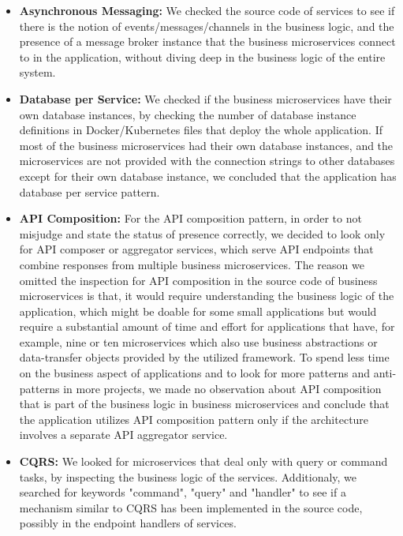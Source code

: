 \documentclass{Configuration_Files/PoliMi3i_thesis}
\begin{document}
\begin{itemize}
    \item \textbf{Asynchronous Messaging:} We checked the source code of services to see if there is the notion of events/messages/channels in the business logic, and the presence of a message broker instance that the business microservices connect to in the application, without diving deep in the business logic of the entire system.
    
    \item \textbf{Database per Service:} We checked if the business microservices have their own database instances, by checking the number of database instance definitions in Docker/Kubernetes files that deploy the whole application.
    If most of the business microservices had their own database instances, and the microservices are not provided with the connection strings to other databases except for their own database instance, we concluded that the application has database per service pattern.
    
    \item \textbf{API Composition:} For the API composition pattern, in order to not misjudge and state the status of presence correctly, we decided to look only for API composer or aggregator services, which serve API endpoints that combine responses from multiple business microservices.
    The reason we omitted the inspection for API composition in the source code of business microservices is that, it would require understanding the business logic of the application, which might be doable for some small applications but would require a substantial amount of time and effort for applications that have, for example, nine or ten microservices which also use business abstractions or data-transfer objects provided by the utilized framework.
    To spend less time on the business aspect of applications and to look for more patterns and anti-patterns in more projects, we made no observation about API composition that is part of the business logic in business microservices and conclude that the application utilizes API composition pattern only if the architecture involves a separate API aggregator service.
    
    \item \textbf{CQRS:} We looked for microservices that deal only with query or command tasks, by inspecting the business logic of the services. 
    Additionaly, we searched for keywords "command", "query" and "handler" to see if a mechanism similar to CQRS has been implemented in the source code, possibly in the endpoint handlers of services.
    

\end{itemize}
\end{document}
